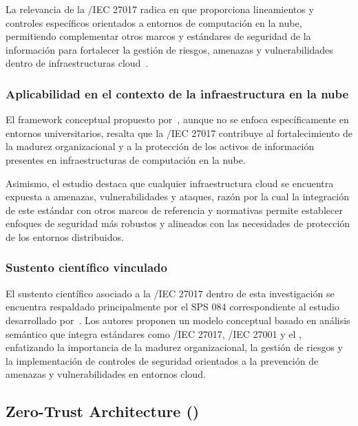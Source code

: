 La relevancia de la \ISO/IEC 27017 radica en que proporciona lineamientos y controles específicos orientados a entornos de computación en la 
nube, permitiendo complementar otros marcos y estándares de seguridad de la información para fortalecer la gestión de riesgos, amenazas y 
vulnerabilidades dentro de infraestructuras cloud~\cite{tissir2021cybersecurity}.

\subsubsection{Aplicabilidad en el contexto de la infraestructura en la nube}

El framework conceptual propuesto por~\cite{tissir2021cybersecurity}, aunque no se enfoca específicamente en entornos universitarios, 
resalta que la \ISO/IEC 27017 contribuye al fortalecimiento de la madurez organizacional y a la protección de los activos de información 
presentes en infraestructuras de computación en la nube.

Asimismo, el estudio destaca que cualquier infraestructura cloud se encuentra expuesta a amenazas, vulnerabilidades y ataques, razón por 
la cual la integración de este estándar con otros marcos de referencia y normativas permite establecer enfoques de seguridad más robustos 
y alineados con las necesidades de protección de los entornos distribuidos.

\subsubsection{Sustento científico vinculado}

El sustento científico asociado a la \ISO/IEC 27017 dentro de esta investigación se encuentra respaldado principalmente por el SPS 084 
correspondiente al estudio desarrollado por~\cite{tissir2021cybersecurity}. Los autores proponen un modelo conceptual basado en análisis 
semántico que integra estándares como \ISO/IEC 27017, \ISO/IEC 27001 y el \NISTCSF, enfatizando la importancia de la madurez organizacional, 
la gestión de riesgos y la implementación de controles de seguridad orientados a la prevención de amenazas y vulnerabilidades en entornos cloud.


\subsection{Zero-Trust Architecture (\ZTA)}


